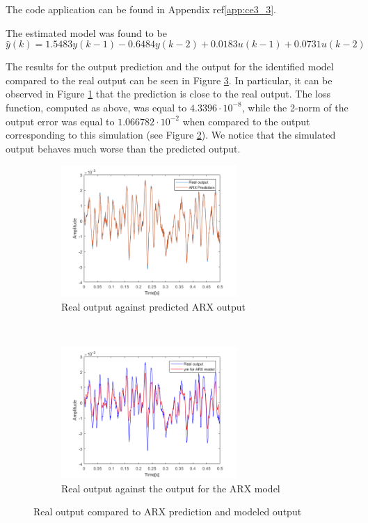 \documentclass[a4paper,11pt]{article}
\begin{document}
The code application can be found in Appendix ref\ref{app:ce3_3}. 

The estimated model was found to be
\begin{equation}
\hat{y}(k)=1.5483y(k-1)-0.6484y(k-2)+0.0183u(k-1)+0.0731u(k-2)
\end{equation}

The results for the output prediction and the output for the identified model compared to the real output can be seen in Figure \ref{fig:ARX_outputs}. In particular, it can be observed in Figure \ref{fig:yhat_ARX} that the prediction is close to the real output. The loss function, computed as above, was equal to $4.3396\cdot10^{-8}$, while the 2-norm of the output error was equal to $1.066782\cdot10^{-2}$ when compared to the output corresponding to this simulation (see Figure \ref{fig:ym_ARX}). We notice that the simulated output behaves much worse than the predicted output.


\begin{figure}[H]
\centering
\begin{subfigure}[t]{0.4\textwidth}
\centering
\includegraphics[height = 5cm]{images/yhat_ARX}
\caption{Real output against predicted ARX output}
\label{fig:yhat_ARX}
\end{subfigure}
~
\begin{subfigure}[t]{0.4\textwidth}
\centering
\includegraphics[height = 5cm]{images/ym_ARX}
\caption{Real output against the output for the ARX model}
\label{fig:ym_ARX}
\end{subfigure}
\caption{Real output compared to ARX prediction and modeled output}
\label{fig:ARX_outputs}
\end{figure}
\end{document}
